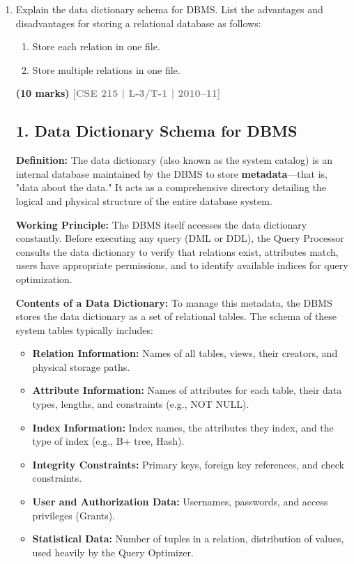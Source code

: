 \documentclass[12pt,a3paper]{article}
\newcommand{\yr}[1]{\hfill\textcolor{gray}{\small\textbf{[#1]}}}
\newcommand{\mk}[1]{\textcolor{orange!70!black}{\small\textbf{(#1 marks)}}}
\begin{document}
\begin{enumerate}
\item Explain the data dictionary schema for DBMS. List the advantages and disadvantages for storing a relational database as follows:
\begin{enumerate}
  \item Store each relation in one file.
  \item Store multiple relations in one file.
\end{enumerate}
\mk{10} \yr{CSE 215 | L-3/T-1 | 2010--11}

\begin{tcolorbox}[enhanced,breakable,ansbox,colback=cA!4,colframe=cA,boxrule=0.8pt,arc=5pt,title={\textbf{Answer}},fonttitle=\bfseries\color{white},colbacktitle=cA]

\subsection*{1. Data Dictionary Schema for DBMS}

\textbf{Definition:} The data dictionary (also known as the system catalog) is an internal database maintained by the DBMS to store \textbf{metadata}—that is, "data about the data." It acts as a comprehensive directory detailing the logical and physical structure of the entire database system. 

\textbf{Working Principle:} The DBMS itself accesses the data dictionary constantly. Before executing any query (DML or DDL), the Query Processor consults the data dictionary to verify that relations exist, attributes match, users have appropriate permissions, and to identify available indices for query optimization.

\textbf{Contents of a Data Dictionary:}
To manage this metadata, the DBMS stores the data dictionary as a set of relational tables. The schema of these system tables typically includes:
\begin{itemize}
    \item \textbf{Relation Information:} Names of all tables, views, their creators, and physical storage paths.
    \item \textbf{Attribute Information:} Names of attributes for each table, their data types, lengths, and constraints (e.g., NOT NULL).
    \item \textbf{Index Information:} Index names, the attributes they index, and the type of index (e.g., B+ tree, Hash).
    \item \textbf{Integrity Constraints:} Primary keys, foreign key references, and check constraints.
    \item \textbf{User and Authorization Data:} Usernames, passwords, and access privileges (Grants).
    \item \textbf{Statistical Data:} Number of tuples in a relation, distribution of values, used heavily by the Query Optimizer.
\end{itemize}


\end{tcolorbox}
\end{enumerate}
\end{document}
